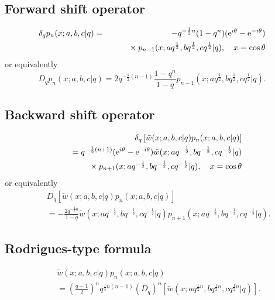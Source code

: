 \documentclass[envcountchap,graybox]{svmono}
\newcommand{\mathindent}{\hspace{7.5mm}}
\newcommand{\e}{\textrm{e}}
\begin{document}
\subsection*{Forward shift operator}
\begin{eqnarray}
\label{shift1ContDualqHahnI}
\delta_q p_n(x;a,b,c|q)&=&-q^{-\frac{1}{2}n}(1-q^n)(\e^{i\theta}-\e^{-i\theta})\nonumber\\
& &{}\mathindent{}\times p_{n-1}(x;aq^{\frac{1}{2}},bq^{\frac{1}{2}},cq^{\frac{1}{2}}|q),\quad x=\cos\theta
\end{eqnarray}
or equivalently
\begin{equation}
\label{shift1ContDualqHahnII}
D_q p_n(x;a,b,c|q)=
2q^{-\frac{1}{2}(n-1)}\frac{1-q^n}{1-q}p_{n-1}(x;aq^{\frac{1}{2}},bq^{\frac{1}{2}},cq^{\frac{1}{2}}|q).
\end{equation}

\subsection*{Backward shift operator}
\begin{eqnarray}
\label{shift2ContDualqHahnI}
& &\delta_q\left[{\tilde w}(x;a,b,c|q)p_n(x;a,b,c|q)\right]\nonumber\\
& &{}=q^{-\frac{1}{2}(n+1)}(\e^{i\theta}-\e^{-i\theta})
{\tilde w}(x;aq^{-\frac{1}{2}},bq^{-\frac{1}{2}},cq^{-\frac{1}{2}}|q)\nonumber\\
& &{}\mathindent{}\times p_{n+1}(x;aq^{-\frac{1}{2}},bq^{-\frac{1}{2}},cq^{-\frac{1}{2}}|q),
\quad x=\cos\theta
\end{eqnarray}
or equivalently
\begin{eqnarray}
\label{shift2ContDualqHahnII}
& &D_q\left[{\tilde w}(x;a,b,c|q)p_n(x;a,b,c|q)\right]\nonumber\\
& &{}=-\frac{2q^{-\frac{1}{2}n}}{1-q}{\tilde w}(x;aq^{-\frac{1}{2}},bq^{-\frac{1}{2}},cq^{-\frac{1}{2}}|q)
p_{n+1}(x;aq^{-\frac{1}{2}},bq^{-\frac{1}{2}},cq^{-\frac{1}{2}}|q).
\end{eqnarray}

\subsection*{Rodrigues-type formula}
\begin{eqnarray}
\label{RodContDualqHahn}
& &{\tilde w}(x;a,b,c|q)p_n(x;a,b,c|q)\nonumber\\
& &{}=\left(\frac{q-1}{2}\right)^nq^{\frac{1}{4}n(n-1)}\left(D_q\right)^n\left[{\tilde w}(x;aq^{\frac{1}{2}n},bq^{\frac{1}{2}n},cq^{\frac{1}{2}n}|q)\right].
\end{eqnarray}
\end{document}
